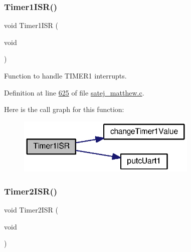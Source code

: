 \mbox{\label{tm4c123gh6pm__startup__ccs_8c_afdad67070c699e644b8ddae35b29347b}} 
\subsubsection{\texorpdfstring{Timer1ISR()}{Timer1ISR()}}
{\footnotesize\ttfamily void Timer1\+I\+SR (\begin{DoxyParamCaption}\item[{void}]{ }\end{DoxyParamCaption})}



Function to handle T\+I\+M\+E\+R1 interrupts. 



Definition at line \mbox{\hyperlink{satej__matthew_8c_source_l00625}{625}} of file \mbox{\hyperlink{satej__matthew_8c_source}{satej\+\_\+matthew.\+c}}.

Here is the call graph for this function\+:
\nopagebreak
\begin{figure}[H]
\begin{center}
\leavevmode
\includegraphics[width=244pt]{tm4c123gh6pm__startup__ccs_8c_afdad67070c699e644b8ddae35b29347b_cgraph}
\end{center}
\end{figure}
\mbox{\label{tm4c123gh6pm__startup__ccs_8c_a424b9010ddc61d3484dca1b6af5af5b0}} 
\subsubsection{\texorpdfstring{Timer2ISR()}{Timer2ISR()}}
{\footnotesize\ttfamily void Timer2\+I\+SR (\begin{DoxyParamCaption}\item[{void}]{ }\end{DoxyParamCaption})}



